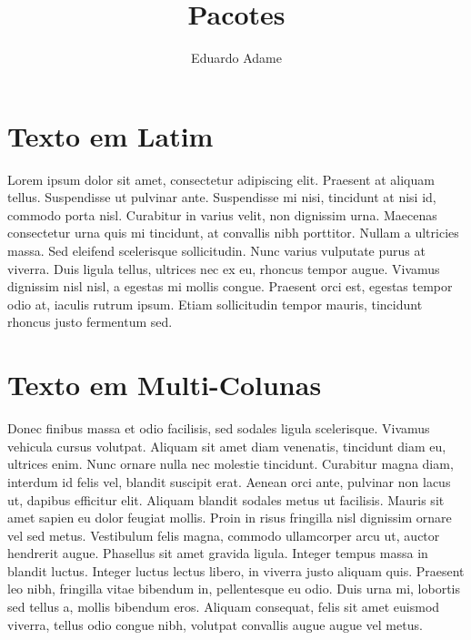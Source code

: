 \documentclass[12pt,a4paper]{article}
\author{Eduardo Adame}
\title{Pacotes}
\begin{document}
\maketitle
\newpage
\tableofcontents
\newpage

\section{Texto em Latim}
Lorem ipsum dolor sit amet, consectetur adipiscing elit. Praesent at aliquam tellus. Suspendisse ut pulvinar ante. Suspendisse mi nisi, tincidunt at nisi id, commodo porta nisl. Curabitur in varius velit, non dignissim urna. Maecenas consectetur urna quis mi tincidunt, at convallis nibh porttitor. Nullam a ultricies massa. Sed eleifend scelerisque sollicitudin. Nunc varius vulputate purus at viverra. Duis ligula tellus, ultrices nec ex eu, rhoncus tempor augue. Vivamus dignissim nisl nisl, a egestas mi mollis congue. Praesent orci est, egestas tempor odio at, iaculis rutrum ipsum. Etiam sollicitudin tempor mauris, tincidunt rhoncus justo fermentum sed.
\section{Texto em Multi-Colunas}
\begin{multicols}{2}
Donec finibus massa et odio facilisis, sed sodales ligula scelerisque. Vivamus vehicula cursus volutpat. Aliquam sit amet diam venenatis, tincidunt diam eu, ultrices enim. Nunc ornare nulla nec molestie tincidunt. Curabitur magna diam, interdum id felis vel, blandit suscipit erat. Aenean orci ante, pulvinar non lacus ut, dapibus efficitur elit. Aliquam blandit sodales metus ut facilisis. Mauris sit amet sapien eu dolor feugiat mollis. Proin in risus fringilla nisl dignissim ornare vel sed metus. Vestibulum felis magna, commodo ullamcorper arcu ut, auctor hendrerit augue. Phasellus sit amet gravida ligula. Integer tempus massa in blandit luctus. Integer luctus lectus libero, in viverra justo aliquam quis. Praesent leo nibh, fringilla vitae bibendum in, pellentesque eu odio. Duis urna mi, lobortis sed tellus a, mollis bibendum eros. Aliquam consequat, felis sit amet euismod viverra, tellus odio congue nibh, volutpat convallis augue augue vel metus.
\end{multicols}
\end{document}
